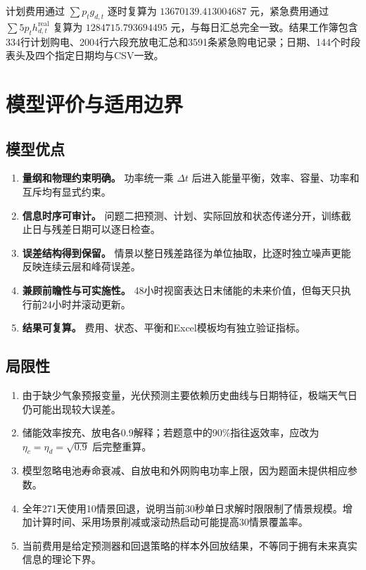 \documentclass[UTF8,12pt,a4paper]{ctexart}
\begin{document}
计划费用通过 $\sum p_tg_{d,t}$ 逐时复算为 $13670139.413004687$ 元，紧急费用通过 $\sum5p_th_{d,t}^{\mathrm{real}}$ 复算为 $1284715.793694495$ 元，与每日汇总完全一致。结果工作簿包含334行计划购电、2004行六段充放电汇总和3591条紧急购电记录；日期、144个时段表头及四个指定日期均与CSV一致。

\section{模型评价与适用边界}

\subsection{模型优点}

\begin{enumerate}
  \item \textbf{量纲和物理约束明确。} 功率统一乘 $\Delta t$ 后进入能量平衡，效率、容量、功率和互斥均有显式约束。
  \item \textbf{信息时序可审计。} 问题二把预测、计划、实际回放和状态传递分开，训练截止日与残差日期可以逐日检查。
  \item \textbf{误差结构得到保留。} 情景以整日残差路径为单位抽取，比逐时独立噪声更能反映连续云层和峰荷误差。
  \item \textbf{兼顾前瞻性与可实施性。} 48小时视窗表达日末储能的未来价值，但每天只执行前24小时并滚动更新。
  \item \textbf{结果可复算。} 费用、状态、平衡和Excel模板均有独立验证指标。
\end{enumerate}

\subsection{局限性}

\begin{enumerate}
  \item 由于缺少气象预报变量，光伏预测主要依赖历史曲线与日期特征，极端天气日仍可能出现较大误差。
  \item 储能效率按充、放电各0.9解释；若题意中的90\%指往返效率，应改为 $\eta_c=\eta_d=\sqrt{0.9}$ 后完整重算。
  \item 模型忽略电池寿命衰减、自放电和外网购电功率上限，因为题面未提供相应参数。
  \item 全年271天使用10情景回退，说明当前30秒单日求解时限限制了情景规模。增加计算时间、采用场景削减或滚动热启动可能提高30情景覆盖率。
  \item 当前费用是给定预测器和回退策略的样本外回放结果，不等同于拥有未来真实信息的理论下界。
\end{enumerate}
\end{document}
